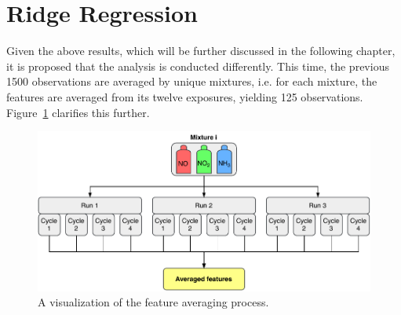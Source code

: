 \section{Ridge Regression}
\label{sec:met-ridge}

Given the above results, which will be further discussed in the following chapter, it is proposed that the analysis is conducted differently. This time, the previous 1500 observations are averaged by unique mixtures, i.e. for each mixture, the features are averaged from its twelve exposures, yielding 125 observations. Figure~\ref{fig:averaging-process} clarifies this further.

\begin{figure}[h]
	\centering
	\includegraphics[width=1\textwidth]{../figures/averaging-process.pdf}
	\caption{A visualization of the feature averaging process.}
	\label{fig:averaging-process}
\end{figure}
